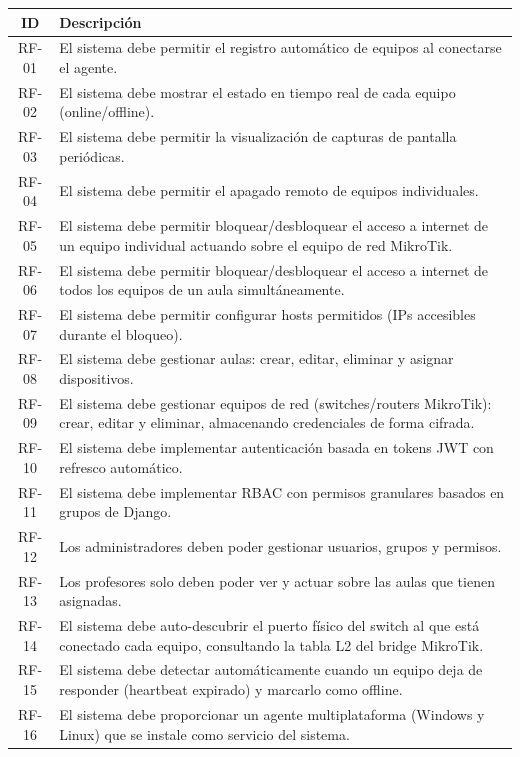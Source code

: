 \documentclass[12pt, a4paper, twoside]{article}
\begin{document}
\begin{longtable}{cp{11cm}}
  \toprule
  \textbf{ID} & \textbf{Descripción} \\
  \midrule
  \endhead
  RF-01 & El sistema debe permitir el registro automático de equipos al conectarse el agente. \\
  RF-02 & El sistema debe mostrar el estado en tiempo real de cada equipo (online/offline). \\
  RF-03 & El sistema debe permitir la visualización de capturas de pantalla periódicas. \\
  RF-04 & El sistema debe permitir el apagado remoto de equipos individuales. \\
  RF-05 & El sistema debe permitir bloquear/desbloquear el acceso a internet de un equipo individual actuando sobre el equipo de red MikroTik. \\
  RF-06 & El sistema debe permitir bloquear/desbloquear el acceso a internet de todos los equipos de un aula simultáneamente. \\
  RF-07 & El sistema debe permitir configurar hosts permitidos (IPs accesibles durante el bloqueo). \\
  RF-08 & El sistema debe gestionar aulas: crear, editar, eliminar y asignar dispositivos. \\
  RF-09 & El sistema debe gestionar equipos de red (switches/routers MikroTik): crear, editar y eliminar, almacenando credenciales de forma cifrada. \\
  RF-10 & El sistema debe implementar autenticación basada en tokens JWT con refresco automático. \\
  RF-11 & El sistema debe implementar RBAC con permisos granulares basados en grupos de Django. \\
  RF-12 & Los administradores deben poder gestionar usuarios, grupos y permisos. \\
  RF-13 & Los profesores solo deben poder ver y actuar sobre las aulas que tienen asignadas. \\
  RF-14 & El sistema debe auto-descubrir el puerto físico del switch al que está conectado cada equipo, consultando la tabla L2 del bridge MikroTik. \\
  RF-15 & El sistema debe detectar automáticamente cuando un equipo deja de responder (heartbeat expirado) y marcarlo como offline. \\
  RF-16 & El sistema debe proporcionar un agente multiplataforma (Windows y Linux) que se instale como servicio del sistema. \\
  \bottomrule
\end{longtable}
\end{document}
